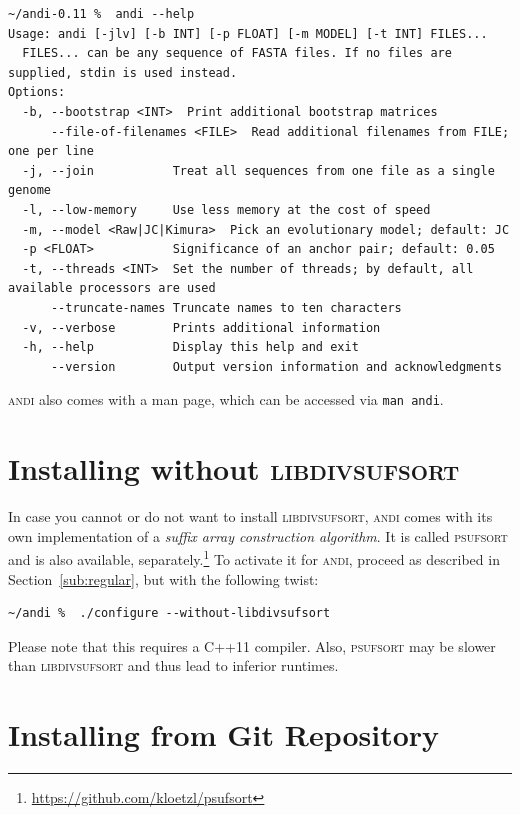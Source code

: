\documentclass[a4paper,
  10pt,
  english,
  DIV=12,
  BCOR=8mm]{scrbook}
\newcommand{\algo}[1]{\textsc{{#1}}}
\newcommand{\andi}{\algo{andi}\xspace}
\begin{document}
\begin{lstlisting}
~/andi-0.11 %  andi --help
Usage: andi [-jlv] [-b INT] [-p FLOAT] [-m MODEL] [-t INT] FILES...
  FILES... can be any sequence of FASTA files. If no files are supplied, stdin is used instead.
Options:
  -b, --bootstrap <INT>  Print additional bootstrap matrices
      --file-of-filenames <FILE>  Read additional filenames from FILE; one per line
  -j, --join           Treat all sequences from one file as a single genome
  -l, --low-memory     Use less memory at the cost of speed
  -m, --model <Raw|JC|Kimura>  Pick an evolutionary model; default: JC
  -p <FLOAT>           Significance of an anchor pair; default: 0.05
  -t, --threads <INT>  Set the number of threads; by default, all available processors are used
      --truncate-names Truncate names to ten characters
  -v, --verbose        Prints additional information
  -h, --help           Display this help and exit
      --version        Output version information and acknowledgments
\end{lstlisting}

\noindent \andi also comes with a man page, which can be accessed via \lstinline$man andi$. %

\section{Installing without \algo{libdivsufsort}} \label{sub:wo-divsufsort}

In case you cannot or do not want to install \algo{libdivsufsort}, \andi comes with its own implementation of a \emph{suffix array construction algorithm}. It is called \algo{psufsort} and is also available, separately.\footnote{\url{https://github.com/kloetzl/psufsort}} To activate it for \algo{andi}, proceed as described in Section~\ref{sub:regular}, but with the following twist:

\begin{lstlisting}
~/andi %  ./configure --without-libdivsufsort
\end{lstlisting}

Please note that this requires a C++11 compiler. Also, \algo{psufsort} may be slower than \algo{libdivsufsort} and thus lead to inferior runtimes.

\section{Installing from Git Repository}
\end{document}
